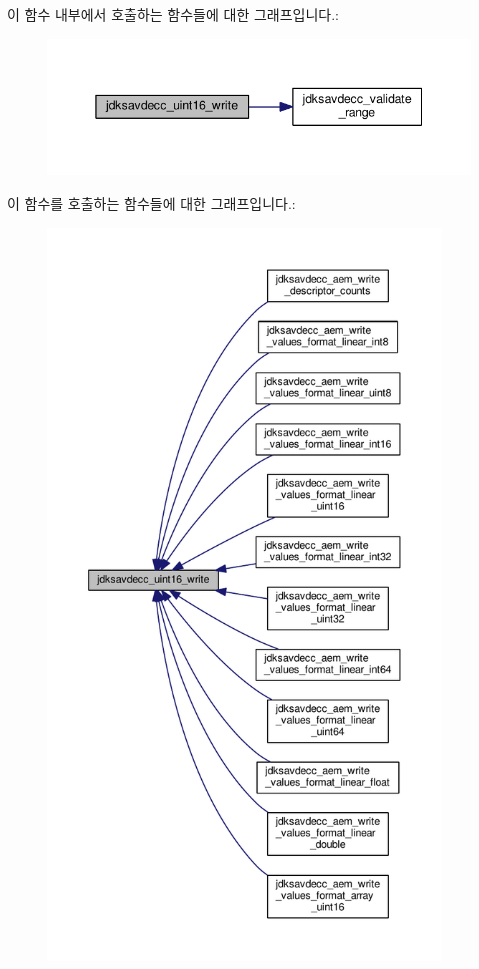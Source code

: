 이 함수 내부에서 호출하는 함수들에 대한 그래프입니다.\+:
\nopagebreak
\begin{figure}[H]
\begin{center}
\leavevmode
\includegraphics[width=345pt]{group__endian_ga4c0851ce17bde5306fdb04bfb5b75af1_cgraph}
\end{center}
\end{figure}




이 함수를 호출하는 함수들에 대한 그래프입니다.\+:
\nopagebreak
\begin{figure}[H]
\begin{center}
\leavevmode
\includegraphics[height=550pt]{group__endian_ga4c0851ce17bde5306fdb04bfb5b75af1_icgraph}
\end{center}
\end{figure}


